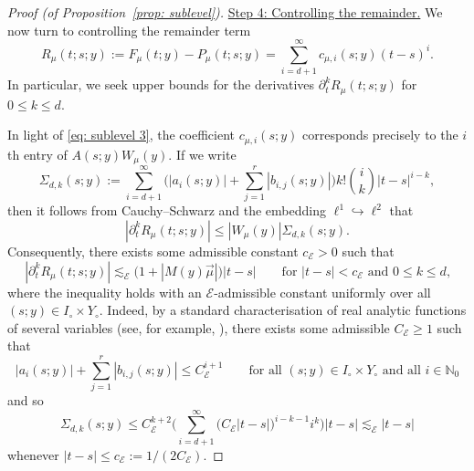 \documentclass[reqno]{amsart}
\numberwithin{equation}{section}
\newcommand{\N}{\mathbb{N}}
\newcommand{\sE}{\mathscr{E}}
\theoremstyle{plain}
\theoremstyle{definition}
\begin{document}
\begin{proof}[Proof (of Proposition~\ref{prop: sublevel})]



\noindent \underline{Step 4: Controlling the remainder.} We now turn to controlling the remainder term
\begin{equation*}
    R_{\mu}(t;s;y) := F_{\mu}(t;y) - P_{\mu}(t;s;y) = \sum_{i = d + 1}^{\infty} c_{\mu,i}(s;y) (t-s)^i. 
\end{equation*}
In particular, we seek upper bounds for the derivatives $\partial_t^k R_{\mu}(t;s;y)$ for $0 \leq k \leq d$.

In light of \eqref{eq: sublevel 3}, the coefficient $c_{\mu,i}(s;y)$ corresponds precisely to the $i$th entry of $A(s;y) W_{\mu}(y)$. If we write
\begin{equation*}
\Sigma_{d,k}(s;y) := \sum_{i=d+1}^{\infty} \Big(|a_i(s;y)| + \sum_{j=1}^r  |b_{i,j}(s;y)|\Big) k! \binom{i}{k}|t-s|^{i-k},
\end{equation*}
then it follows from Cauchy--Schwarz and the embedding $\ell^1 \hookrightarrow \ell^2$ that 
\begin{equation*}
 |\partial^k_t R_{\mu}(t;s;y)| \leq |W_{\mu}(y)| \Sigma_{d,k}(s;y). 
\end{equation*}
Consequently, there exists some admissible constant $c_{\sE} > 0$ such that 
\begin{equation}\label{eq: sublevel 5}  
    |\partial^k_t R_{\mu}(t;s;y)| \lesssim_{\sE} \big(1 + |M(y) \vec{\mu}|\big)|t-s| \qquad \textrm{for $|t - s| < c_{\sE}$ and $0 \leq k \leq d$,}
\end{equation}
 where the inequality holds with an $\sE$-admissible constant uniformly over all $(s;y) \in I_{\circ}  \times Y_{\circ}$. Indeed, by a standard characterisation of real analytic functions of several variables (see, for example, \cite[p.24, p.281]{Hormander1990}), there exists some admissible $C_{\sE} \geq 1$ such that
\begin{equation*}
    |a_i(s;y)| + \sum_{j=1}^r  |b_{i,j}(s;y)|  \leq  C_{\sE}^{i+1} \qquad \textrm{for all $(s;y) \in I_{\circ} \times Y_{\circ}$ and all $i \in \N_0$} 
\end{equation*}
and so 
\begin{equation*}
\Sigma_{d,k}(s;y) 
\leq C_{\sE}^{k+2} \Big(
\sum_{i = d+1}^{\infty} \big(C_{\sE}|t-s|\big)^{i-k -1} i^k \Big)|t-s|
\lesssim_{\sE} |t-s|
\end{equation*}
whenever $|t-s| \leq c
_{\sE} := 1/(2C_{\sE})$.
\medskip



\end{proof}
\end{document}
